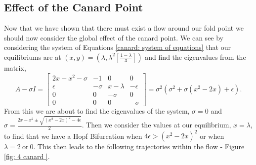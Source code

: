 \subsection{Effect of the Canard Point}\label{sec:effect-of-the-canard-point}
Now that we have shown that there must exist a flow around our fold point we should now consider the global effect of the canard point. We can see by considering the  system of Equations \ref{canard: system of equations} that our equilibriums are at $ (x,y)=(\lambda,\lambda^2[\frac{1-\lambda}{3}]) $ and find the eigenvalues from the matrix, 
\begin{equation}
A-\sigma I=\begin{bmatrix}
2x-x^2-\sigma&-1&0&0\\
\epsilon&-\sigma&x-\lambda&-\epsilon\\
0&0&-\sigma&0\\
0&0&0&-\sigma
\end{bmatrix}=\sigma^2(\sigma^2+\sigma(x^2-2x)+\epsilon).
\end{equation}
From this we are about to find the eigenvalues of the system, $ \sigma=0 $ and $ \sigma=\frac{2x-x^2\pm\sqrt{(x^2-2x)^2-4\epsilon}}{2} $. Then we consider the values at our equilibrium, $ x=\lambda $, to find that we have a Hopf Bifurcation when $ 4\epsilon>(x^2-2x)^2 $ or when $ \lambda=2 \ \text{or} \ 0 $. This then leads to the following trajectories within the flow - Figure \ref{fig: 4 canard }.

